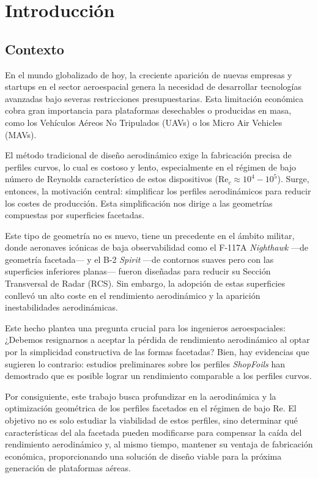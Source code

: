 \cleardoublepage

\chapter{Introducción}
\label{cap:intro} %

\section{Contexto}
\label{sec:cont}

En el mundo globalizado de hoy, la creciente aparición de nuevas empresas y startups en el sector aeroespacial genera la necesidad de desarrollar tecnologías avanzadas bajo severas restricciones presupuestarias. Esta limitación económica cobra gran importancia para plataformas desechables o producidas en masa, como los Vehículos Aéreos No Tripulados (UAVs) o los Micro Air Vehicles (MAVs).

El método tradicional de diseño aerodinámico exige la fabricación precisa de perfiles curvos, lo cual es costoso y lento, especialmente en el régimen de bajo número de Reynolds característico de estos dispositivos (\( \text{Re}_c \approx 10^4 - 10^5 \)). Surge, entonces, la motivación central: simplificar los perfiles aerodinámicos para reducir los costes de producción. Esta simplificación nos dirige a las geometrías compuestas por superficies facetadas.

Este tipo de geometría no es nuevo, tiene un precedente en el ámbito militar, donde aeronaves icónicas de baja observabilidad como el F-117A \emph{Nighthawk} —de geometría facetada— y el B-2 \emph{Spirit} —de contornos suaves pero con las superficies inferiores planas— fueron diseñadas para reducir su Sección Transversal de Radar (RCS). Sin embargo, la adopción de estas superficies conllevó un alto coste en el rendimiento aerodinámico y la aparición inestabilidades aerodinámicas.

Este hecho plantea una pregunta crucial para los ingenieros aeroespaciales: ¿Debemos resignarnos a aceptar la pérdida de rendimiento aerodinámico al optar por la simplicidad constructiva de las formas facetadas? Bien, hay evidencias que sugieren lo contrario: estudios preliminares sobre los perfiles \emph{ShopFoils} han demostrado que es posible lograr un rendimiento comparable a los perfiles curvos.

Por consiguiente, este trabajo busca profundizar en la aerodinámica y la optimización geométrica de los perfiles facetados en el régimen de bajo Re. El objetivo no es solo estudiar la viabilidad de estos perfiles, sino determinar qué características del ala facetada pueden modificarse para compensar la caída del rendimiento aerodinámico y, al mismo tiempo, mantener su ventaja de fabricación económica, proporcionando una solución de diseño viable para la próxima generación de plataformas aéreas.

